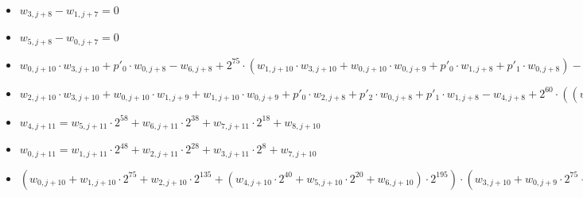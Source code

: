 \begin{itemize}
\item $w_{3, j + 8} - w_{1, j + 7} = 0$
\item $w_{5, j + 8} - w_{0, j + 7} = 0$

\item $w_{0, j + 10} \cdot w_{3, j + 10} + p'_0 \cdot w_{0, j + 8} - w_{6, j + 8} + 2^{75} \cdot (w_{1, j + 10} \cdot w_{3, j + 10} + w_{0, j + 10} \cdot w_{0, j + 9} + p'_0 \cdot w_{1, j + 8} + p'_1 \cdot w_{0, j + 8}) - w_{5, j + 8}\ dot 2^{75} - w_{7, j + 9} \cdot 2^{135} = 0$
\item $w_{2, j + 10} \cdot w_{3, j + 10} + w_{0, j + 10} \cdot w_{1, j + 9} + w_{1, j + 10} \cdot w_{0, j + 9} + p'_0 \cdot w_{2, j + 8} + p'_2 \cdot w_{0, j + 8} + p'_1 \cdot w_{1, j + 8} - w_{4, j + 8} + 2^{60} \cdot ((w_{4, j + 10} \cdot 2^{40} + w_{5, j + 10} \cdot 2^{20} + w_{6, j + 10}) \cdot w_{3, j + 10} + w_{0, j + 10} \cdot (w_{3, j + 9} \cdot 2^{40} + w_{4, j + 9} \cdot 2^{20} + w_{5, j + 9}) + w_{1, j + 10} \cdot w_{1, j + 9} + w_{2, j + 10} \cdot w_{0, j + 9} + p'_0 \cdot (w_{7, j + 8} \cdot 2^{40} + w_{8, j + 8} \cdot 2^{20} + w_{2, j + 9}) + p'_3 \cdot w_{0, j + 8} + p'_1 \cdot w_{2, j + 8} + p'_2 \cdot w_{1, j + 8}) - 2^{60} \cdot w_{3, j + 8} + 2^{120} \cdot ((w_{4, j + 10} \cdot 2^{40} + w_{5, j + 10} \cdot 2^{20} + w_{6, j + 10}) \cdot w_{0, j + 9} + w_{1, j + 10} \cdot(w_{3, j + 9} \cdot 2^{40} + w_{4, j + 9} \cdot 2^{20} + w_{5, j + 9}) + w_{2, j + 10} \cdot w_{1, j + 9} + p'_1 \cdot (w_{7, j + 8} \cdot 2^{40} + w_{8, j + 8} \cdot 2^{20} + w_{2, j + 9}) + p'_3 \cdot w_{1, j + 8} + p'_2 \cdot w_{2, j + 8}) + w_{7, j + 9} - 2^{122} \cdot w_{8, j + 9} = 0$
\item $w_{4, j + 11} = w_{5, j + 11} \cdot 2^{58} + w_{6, j + 11} \cdot 2^{38} + w_{7, j + 11} \cdot 2^{18} + w_{8, j + 10}$
\item $w_{0, j + 11} = w_{1, j + 11} \cdot 2^{48} + w_{2, j + 11} \cdot 2^{28} + w_{3, j + 11} \cdot 2^8 + w_{7, j +10}$
\item $(w_{0, j + 10}  + w_{1, j + 10} \cdot 2^{75} + w_{2, j + 10} \cdot 2^{135} + (w_{4, j + 10} \cdot 2^{40} + w_{5, j + 10} \cdot 2^{20} + w_{6, j + 10}) \cdot 2^{195}) \cdot (w_{3, j + 10} + w_{0, j + 9} \cdot 2^{75} +w_{1, j + 9} \cdot 2^{135} + (w_{3, j + 9} \cdot 2^{40} + w_{4, j + 9} \cdot 2^{20} + w_{5, j + 9}) \cdot 2^{195}) = p \cdot (w_{0, j + 8} + w_{1, j + 8} \cdot 2^{75} + w_{2, j + 8} \cdot 2^{135} +  (w_{7, j + 8} \cdot 2^{40} + w_{8, j + 8} \cdot 2^{20} + w_{2, j + 9}) \cdot 2^{195}) + w_{6, j + 8} + w_{5, j + 8} \cdot 2^{75} + w_{4, j + 8} \cdot 2^{135} + w_{3, j + 8} \cdot 2^{195}$
\end{itemize}

